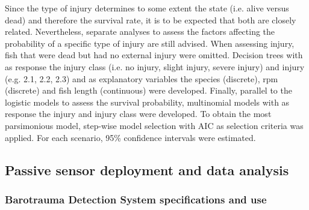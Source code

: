 \documentclass[fleqn,10pt]{wlscirep}
\begin{document}

Since the type of injury determines to some extent the state (i.e. alive versus dead) and therefore the survival rate, it is to be expected that both are closely related. Nevertheless, separate analyses to assess the factors affecting the probability of a specific type of injury are still advised. When assessing injury, fish that were dead but had no external injury were omitted. Decision trees with as response the injury class (i.e. no injury, slight injury, severe injury) and injury (e.g. 2.1, 2.2, 2.3) and as explanatory variables the species (discrete), rpm (discrete) and fish length (continuous) were developed. Finally, parallel to the logistic models to assess the survival probability, multinomial models with as response the injury and injury class were developed. To obtain the most parsimonious model, step-wise model selection with AIC as selection criteria was applied. For each scenario, 95\% confidence intervals were estimated.

\subsection*{Passive sensor deployment and data analysis}

\subsubsection*{Barotrauma Detection System specifications and use}
\end{document}
